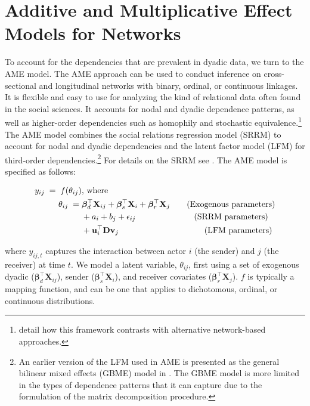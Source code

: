 \documentclass[12pt]{amsart}
\begin{document}
\section{\textbf{Additive and Multiplicative Effect Models for Networks}}

To account for the dependencies that are prevalent in dyadic data, we turn to the AME model. The AME approach can be used to conduct inference on cross-sectional and longitudinal networks with binary, ordinal, or continuous linkages. It is flexible and easy to use for analyzing the kind of relational data often found in the social sciences. It accounts for nodal and dyadic dependence patterns, as well as higher-order dependencies such as homophily and stochastic equivalence.\footnote{\citet{minhas:etal:2019} detail how this framework contrasts with alternative network-based approaches. } The AME model combines the social relations regression model (SRRM) to account for nodal and dyadic dependencies and the latent factor model (LFM) for third-order dependencies.\footnote{An earlier version of the LFM  used in AME is presented as the general bilinear mixed effects (GBME) model in \citet{hoff:2005}. The GBME model is more limited in the types of dependence patterns that it can capture due to the formulation of the matrix decomposition procedure.}  For details on the SRRM see \citet{li:loken:2002,hoff:2005,dorff:minhas:2017}. The AME model is specified as follows:

\begin{align}
	\begin{aligned}
		y_{ij} \;=\; f(\theta_{ij}) &\text{, where } \\
		\theta_{ij} \;=\;& \bm\beta_{d}^{\top} \mathbf{X}_{ij} + \bm\beta_{s}^{\top} \mathbf{X}_{i} + \bm\beta_{r}^{\top} \mathbf{X}_{j} \text{\qquad(Exogenous parameters)} \\
		& + a_{i} + b_{j} + \epsilon_{ij} \text{\qquad\qquad\qquad\quad(SRRM parameters)} \\
		& + \mathbf{u}_{i}^{\top} \mathbf{D} \mathbf{v}_{j}  \text{\qquad\qquad\qquad\qquad\qquad\;(LFM parameters)} \\
	\label{eqn:ame}
	\end{aligned}
\end{align}

where $y_{ij,t}$ captures the interaction between actor $i$ (the sender) and $j$ (the receiver) at time $t$. We model a latent variable, $\theta_{ij}$, first using a set of exogenous dyadic ($\bm\beta_{d}^{\top} \mathbf{X}_{ij}$), sender ($\bm\beta_{s}^{\top} \mathbf{X}_{i}$), and receiver covariates ($\bm\beta_{r}^{\top} \mathbf{X}_{j}$). $f$ is typically a mapping function, and can be one that applies to dichotomous, ordinal, or continuous distributions.
\end{document}
